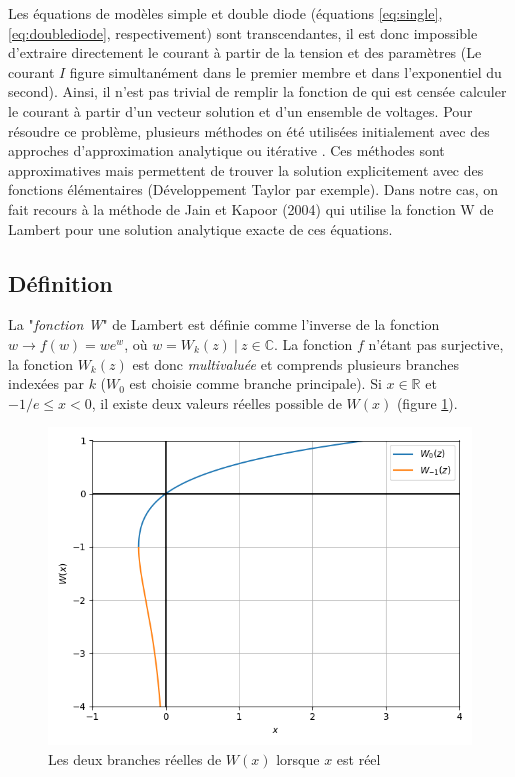 Les équations de modèles simple et double diode (équations \ref{eq:single}, \ref{eq:doublediode}, respectivement) sont transcendantes, il est donc impossible d'extraire directement le courant à partir de la tension et des paramètres (Le courant $I$ figure simultanément dans le premier membre et dans l'exponentiel du second). Ainsi, il n'est pas trivial de remplir la fonction de  qui est censée calculer le courant à partir d'un vecteur solution et d'un ensemble de voltages. Pour résoudre ce problème, plusieurs méthodes on été utilisées initialement avec des approches d'approximation analytique ou itérative \cite{Shur1991,AbuelmaAtti1992,Datta1992}. Ces méthodes sont approximatives mais permettent de trouver la solution explicitement avec des fonctions élémentaires (Développement Taylor par exemple). Dans notre cas, on fait recours à la méthode de Jain et Kapoor (2004) \cite{Jain2004, Lun2015} qui utilise la fonction W de Lambert pour une solution analytique exacte de ces équations.

\subsection{Définition}
La "\textit{fonction W}" de Lambert est définie comme l'inverse de la fonction $w \rightarrow f(w) =  w e^w$, où $w = W_k(z)\ |\ z \in \mathbb{C}$. La fonction $f$ n'étant pas surjective, la fonction $W_k(z)$ est donc \textit{multivaluée} et comprends plusieurs branches indexées par $k$ ($W_0$ est choisie comme branche principale). Si $x \in \mathbb{R}$ et $-1/e \leq x < 0$, il existe deux valeurs réelles possible de $W(x)$ (figure \ref{fig:lambertw}).

\begin{figure}[H]
  \begin{center}
    \includegraphics[width=.6\textwidth]{resources/lambertw.png}
    \caption{Les deux branches réelles de $W(x)$ lorsque $x$ est réel}
    \label{fig:lambertw}
  \end{center}
\end{figure}

